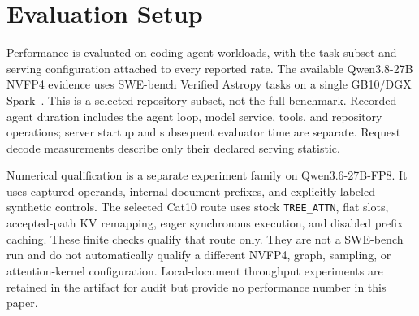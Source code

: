 \documentclass[conference]{IEEEtran}
\begin{document}
\section{Evaluation Setup}
\label{sec:protocol}
Performance is evaluated on coding-agent workloads, with the task subset and serving configuration attached to every reported rate. The available Qwen3.8-27B NVFP4 evidence uses SWE-bench Verified Astropy tasks on a single GB10/DGX Spark~\cite{lumo2026archive,jimenez2024swe}. This is a selected repository subset, not the full benchmark. Recorded agent duration includes the agent loop, model service, tools, and repository operations; server startup and subsequent evaluator time are separate. Request decode measurements describe only their declared serving statistic.

Numerical qualification is a separate experiment family on Qwen3.6-27B-FP8. It uses captured operands, internal-document prefixes, and explicitly labeled synthetic controls. The selected Cat10 route uses stock \texttt{TREE\_ATTN}, flat slots, accepted-path KV remapping, eager synchronous execution, and disabled prefix caching. These finite checks qualify that route only. They are not a SWE-bench run and do not automatically qualify a different NVFP4, graph, sampling, or attention-kernel configuration. Local-document throughput experiments are retained in the artifact for audit but provide no performance number in this paper.
\end{document}
